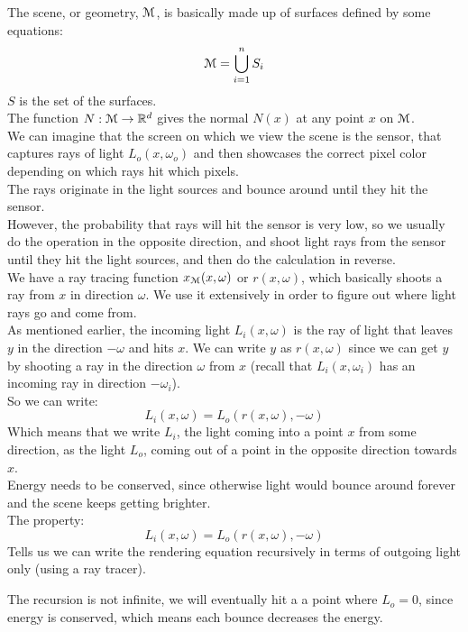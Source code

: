 \documentclass[12pt]{article}
\begin{document}
The scene, or geometry,
$\mathcal{M}$, is basically made up of surfaces defined
by some equations:
\[ \mathcal{M} = \bigcup_{i=1}^{n} S_i \]
$S$ is the set of the surfaces. \\

The function $N:\mathcal{M} \to \mathbb{R}^d$
gives the normal $N(x)$ at any point $x$ on $\mathcal{M}$. \\

We can imagine that the screen on which we view the
scene is the sensor, that captures rays of light 
$L_o(x, \omega_o)$ and then showcases the correct pixel
color depending on which rays hit which pixels. \\
The rays originate in the light sources and bounce around
until they hit the sensor. \\
However, the probability that rays will hit the sensor
is very low, so we usually do the operation in the
opposite direction, and shoot light rays from the sensor
until they hit the light sources,
and then do the calculation in reverse. \\

We have a ray tracing function $x_{\mathcal{M}}(x, \omega)$
or $r(x, \omega)$, which basically shoots a ray
from $x$ in direction $\omega$. We use it extensively
in order to figure out where light rays go and come from. \\

As mentioned earlier, the incoming light $L_i(x, \omega)$
is the ray of light that leaves $y$ in the direction $-\omega$
and hits $x$.
We can write $y$ as $r(x,\omega)$
since we can get $y$ by shooting a ray in the direction
$\omega$ from $x$ (recall that $L_i(x, \omega_i)$
has an incoming ray in direction $-\omega_i$). \\
So we can write:
\[ L_i(x, \omega) = L_o(r(x, \omega), -\omega) \]
Which means that we write $L_i$,
the light coming into a point $x$ from some direction,
as the light $L_o$, coming out of a point in
the opposite direction towards $x$. \\

Energy needs to be conserved, since otherwise light would
bounce around forever and the scene keeps getting brighter. \\

The property:
\[ L_i(x, \omega) = L_o(r(x, \omega), -\omega) \]
Tells us we can write the rendering equation recursively
in terms of outgoing light only (using a ray tracer). 

The recursion is not infinite, we will eventually hit a
a point where $L_o = 0$, since energy is conserved,
which means each bounce decreases the energy. \\
\end{document}

